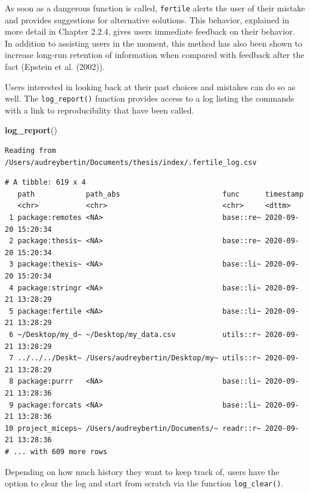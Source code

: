 \documentclass[12pt,twoside]{reedthesis}
\newenvironment{Shaded}{\begin{snugshade}}{\end{snugshade}}
\newcommand{\KeywordTok}[1]{\textcolor[rgb]{0.13,0.29,0.53}{\textbf{#1}}}
\newcommand{\NormalTok}[1]{#1}
\begin{document}
As soon as a dangerous function is called, \texttt{fertile} alerts the user of their mistake and provides suggestions for alternative solutions. This behavior, explained in more detail in Chapter 2.2.4, gives users immediate feedback on their behavior. In addition to assisting users in the moment, this method has also been shown to increase long-run retention of information when compared with feedback after the fact (Epstein et al. (2002)).

Users interested in looking back at their past choices and mistakes can do so as well. The \texttt{log\_report()} function provides access to a log listing the commands with a link to reproducibility that have been called.
\begin{Shaded}
\begin{Highlighting}[]
\KeywordTok{log_report}\NormalTok{()}
\end{Highlighting}
\end{Shaded}
\begin{verbatim}
Reading from /Users/audreybertin/Documents/thesis/index/.fertile_log.csv
\end{verbatim}
\begin{verbatim}
# A tibble: 619 x 4
   path            path_abs                        func      timestamp          
   <chr>           <chr>                           <chr>     <dttm>             
 1 package:remotes <NA>                            base::re~ 2020-09-20 15:20:34
 2 package:thesis~ <NA>                            base::re~ 2020-09-20 15:20:34
 3 package:thesis~ <NA>                            base::li~ 2020-09-20 15:20:34
 4 package:stringr <NA>                            base::li~ 2020-09-21 13:28:29
 5 package:fertile <NA>                            base::li~ 2020-09-21 13:28:29
 6 ~/Desktop/my_d~ ~/Desktop/my_data.csv           utils::r~ 2020-09-21 13:28:29
 7 ../../../Deskt~ /Users/audreybertin/Desktop/my~ utils::r~ 2020-09-21 13:28:29
 8 package:purrr   <NA>                            base::li~ 2020-09-21 13:28:36
 9 package:forcats <NA>                            base::li~ 2020-09-21 13:28:36
10 project_miceps~ /Users/audreybertin/Documents/~ readr::r~ 2020-09-21 13:28:36
# ... with 609 more rows
\end{verbatim}
Depending on how much history they want to keep track of, users have the option to clear the log and start from scratch via the function \texttt{log\_clear()}.
\end{document}
